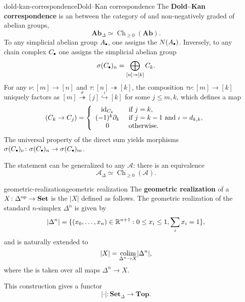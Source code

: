 \begin{topic}{dold-kan-correspondence}{Dold--Kan correspondence}
    The \textbf{Dold--Kan correspondence} is an  between the category of   and non-negatively graded  of abelian groups,
    \[ \textbf{Ab}_\Delta \simeq \operatorname{Ch}_{\ge 0}(\textbf{Ab}) . \]
    To any simplicial abelian group $A_\bdot$, one assigns the  $N(A_\bdot)$.
    Inversely, to any chain complex $C_\bdot$ one assigns the simplicial abelian group
    \[ \sigma(C_\bdot)_n = \bigoplus_{[n] \twoheadrightarrow [k]} C_k . \]
    For any $\nu \colon [m] \to [n]$ and $\tau \colon [n] \twoheadrightarrow [k]$, the composition $\tau\nu \colon [m] \to [k]$ uniquely factors as $[m] \overset{\sigma}{\twoheadrightarrow} [j] \overset{\iota}{\hookrightarrow} [k]$ for some $j \le m, k$, which defines a map
    \[ (C_k \to C_j) = \left\{ \begin{array}{cl} \textup{id}_{C_k} & \textup{ if } j = k , \\ (-1)^k \partial_k & \textup{ if } j = k - 1 \textup{ and } \iota = d_{k,k} , \\ 0 & \textup{ otherwise}. \end{array} \right. \]
    The universal property of the direct sum yields morphisms $\sigma(C_\bdot)_\nu \colon \sigma(C_\bdot)_n \to \sigma(C_\bdot)_m$.
    
    The statement can be generalized to any  $\mathcal{A}$: there is an equivalence
    \[ \mathcal{A}_\Delta \simeq \operatorname{Ch}_{\ge 0}(\mathcal{A}) . \]
\end{topic}

\begin{topic}{geometric-realization}{geometric realization}
    The \textbf{geometric realization} of a  $X \colon \Delta^\textup{op} \to \textbf{Set}$ is the  $|X|$ defined as follows. The geometric realization of the standard $n$-simplex $\Delta^n$ is given by
    \[ |\Delta^n| = \{ (x_0, \ldots, x_n) \in \mathbb{R}^{n + 1} : 0 \le x_i \le 1, \sum_i x_i = 1 \} , \]
    and is naturally extended to
    \[ |X| = \underset{\Delta^n \to X}{\textup{colim}} |\Delta^n| , \]
    where the  is taken over all maps $\Delta^n \to X$.
    
    This construction gives a functor
    \[ |\cdot| \colon \textbf{Set}_\Delta \to \textbf{Top} . \]
\end{topic}

